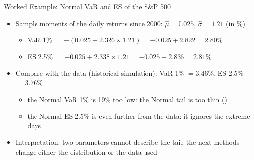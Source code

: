\begin{frame}{Worked Example: Normal VaR and ES of the S\&P 500}
\itemsize{\small}
\begin{itemize}
    \item Sample moments of the daily returns since 2000: $\hat\mu = 0.025$, $\hat\sigma = 1.21$ (in \%)
    \begin{itemize}
        \item VaR 1\% $= -(0.025 - 2.326 \times 1.21) = -0.025 + 2.822 = 2.80\%$
        \item ES 2.5\% $= -0.025 + 2.338 \times 1.21 = -0.025 + 2.836 = 2.81\%$
    \end{itemize}
    \item Compare with the data (historical simulation): VaR 1\% $= 3.46\%$, ES 2.5\% $= 3.76\%$
    \begin{itemize}
        \item the Normal VaR 1\% is 19\% too low: the Normal tail is too thin ()
        \item the Normal ES 2.5\% is even further from the data: it ignores the extreme days
    \end{itemize}
    \item Interpretation: two parameters cannot describe the tail; the next methods change either the distribution or the data used
\end{itemize}
\end{frame}

